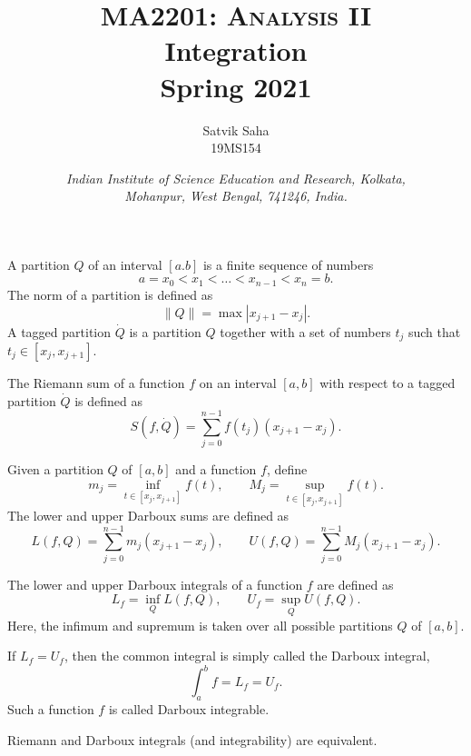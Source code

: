 \documentclass[11pt]{article}
\title{
    \Large\textsc{MA2201: Analysis II} \\
    \Huge \textbf{Integration} \\
    \vspace{5pt}
    \Large{Spring 2021}
}
\author{
    \large Satvik Saha%
    \\\textsc{\small 19MS154}
}
\date{\normalsize
    \textit{Indian Institute of Science Education and Research, Kolkata, \\
    Mohanpur, West Bengal, 741246, India.} \\
}
\newcommand\norm[1]{\left\lVert#1\right\rVert}
\theoremstyle{definition}
\theoremstyle{remark}
\numberwithin{equation}{module}
\begin{document}
    \maketitle

    \begin{definition}[Partition]
        A partition $Q$ of an interval $[a. b]$ is a finite sequence of numbers \[
            a = x_0 < x_1 < \dots < x_{n - 1} < x_n = b.
        \] The norm of a partition is defined as \[
            \norm{Q} = \max |x_{j + 1} - x_j|.
        \] A tagged partition $\dot{Q}$ is a partition $Q$ together with a set of
        numbers $t_j$ such that $t_j \in [x_j, x_{j + 1}]$.
    \end{definition}

    \begin{definition}
        The Riemann sum of a function $f$ on an interval $[a, b]$ with respect to a
        tagged partition $\dot{Q}$ is defined as \[
            S(f, \dot{Q}) = \sum_{j = 0}^{n - 1}  f(t_j)(x_{j + 1} - x_j). 
        \] 
    \end{definition}

    \begin{definition}
        Given a partition $Q$ of $[a, b]$ and a function $f$, define \[
            m_j = \inf_{t \in [x_{j}, x_{j + 1}]} f(t), \qquad
            M_j = \sup_{t \in [x_{j}, x_{j + 1}]} f(t).
        \] The lower and upper Darboux sums are defined as \[
            L(f, Q) = \sum_{j = 0}^{n - 1} m_j(x_{j + 1} - x_j), \qquad
            U(f, Q) = \sum_{j = 0}^{n - 1} M_j(x_{j + 1} - x_j).
        \] 
    \end{definition}

    \begin{definition}
        The lower and upper Darboux integrals of a function $f$ are defined as \[
            L_f = \inf_Q L(f, Q), \qquad U_f = \sup_Q U(f, Q).
        \] Here, the infimum and supremum is taken over all possible partitions $Q$
        of $[a, b]$.

        If $L_f = U_f$, then the common integral is simply called the Darboux
        integral, \[
            \int_a^b f = L_f = U_f.
        \] Such a function $f$ is called Darboux integrable.
    \end{definition}

    \begin{theorem}
        Riemann and Darboux integrals (and integrability) are equivalent.
    \end{theorem}
\end{document}
